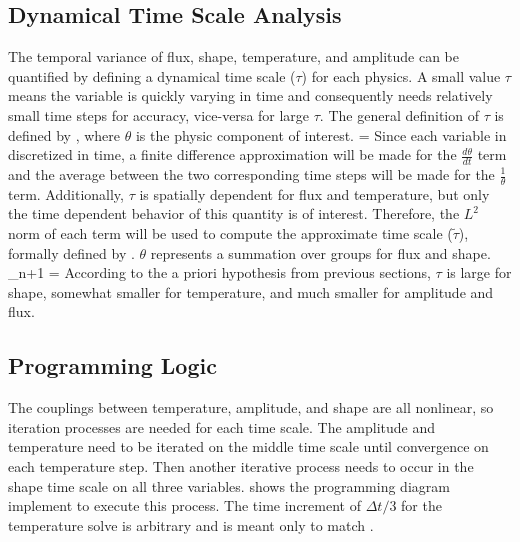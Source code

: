 \subsection{Dynamical Time Scale Analysis}
\label{sect:tau}

The temporal variance of flux, shape, temperature, and amplitude can be quantified by defining a dynamical time scale ($\tau$) for each physics.  A small value $\tau$ means the variable is quickly varying in time and consequently needs relatively small time steps for accuracy, vice-versa for large $\tau$.  The general definition of $\tau$ is defined by , where $\theta$ is the physic component of interest.  
\be
\tau = 
\label{eq:tau1}
\ee
Since each variable in discretized in time, a finite difference approximation will be made for the $\frac{d\theta}{dt}$ term and the average between the two corresponding time steps will be made for the $\frac{1}{\theta}$ term.  Additionally, $\tau$ is spatially dependent for flux and temperature, but only the time dependent behavior of this quantity is of interest.  Therefore, the $L^2$ norm of each term will be used to compute the approximate time scale ($\tilde{\tau}$), formally defined by .  $\theta$ represents a summation over groups for flux and shape.
\be
\tilde{\tau}_{n+1} = 
\label{eq:tau2}
\ee
%
According to the a priori hypothesis from previous sections, $\tau$ is large for shape, somewhat smaller for temperature, and much smaller for amplitude and flux.


\subsection{Programming Logic}

The couplings between temperature, amplitude, and shape are all nonlinear, so iteration processes are needed for each time scale.  The amplitude and temperature need to be iterated on the middle time scale until convergence on each temperature step.  Then another iterative process needs to occur in the shape time scale on all three variables.  shows the programming diagram implement to execute this process. The time increment of $\Delta t/3$ for the temperature solve is arbitrary and is meant only to match .


